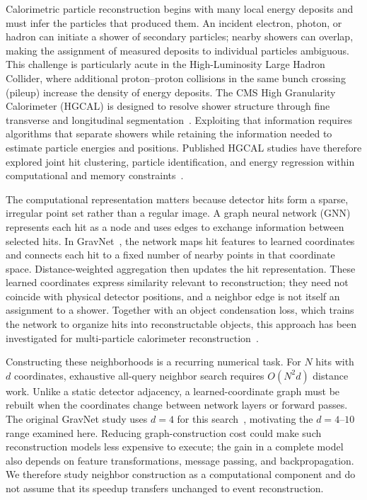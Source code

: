 \documentclass[final,3p,11pt]{elsarticle}
\begin{document}
Calorimetric particle reconstruction begins with many local energy
deposits and must infer the particles that produced them. An incident
electron, photon, or hadron can initiate a shower of secondary particles; nearby
showers can overlap, making the assignment of measured deposits to
individual particles ambiguous. This challenge is particularly acute in
the High-Luminosity Large Hadron Collider, where additional proton--proton
collisions in the same bunch crossing (pileup) increase the density of
energy deposits. The CMS High Granularity Calorimeter (HGCAL) is designed to
resolve shower structure through fine transverse and longitudinal
segmentation~\cite{pitters2018hgcal}. Exploiting that information requires
algorithms that separate showers while retaining the information needed
to estimate particle energies and positions. Published HGCAL studies
have therefore explored joint hit clustering, particle identification,
and energy regression within computational and memory
constraints~\cite{qasim2021multiparticle}.

The computational representation matters because detector hits form a
sparse, irregular point set rather than a regular image. A graph neural
network (GNN) represents each hit as a node and uses edges to exchange
information between selected hits. In GravNet~\cite{Qasim2019GravNet},
the network maps hit features to learned coordinates and connects each
hit to a fixed number of nearby points in that coordinate space.
Distance-weighted aggregation then updates the hit representation.
These learned coordinates express similarity relevant to reconstruction;
they need not coincide with physical detector positions, and a neighbor
edge is not itself an assignment to a shower. Together with an object
condensation loss, which trains the network to organize hits into
reconstructable objects, this approach has been investigated for
multi-particle calorimeter reconstruction~\cite{Kieseler2020ObjectCondensation,qasim2021multiparticle,bhattacharya2022gnn}.

Constructing these neighborhoods is a recurring numerical task. For
$N$ hits with $d$ coordinates, exhaustive all-query neighbor search
requires $O(N^2d)$ distance work. Unlike a static detector adjacency,
a learned-coordinate graph must be rebuilt when the coordinates change
between network layers or forward passes. The original GravNet study
uses $d{=}4$ for this search~\cite{Qasim2019GravNet}, motivating the
$d{=}4$--$10$ range examined here. Reducing graph-construction cost
could make such reconstruction models less expensive to execute;
the gain in a complete model also depends on feature transformations,
message passing, and backpropagation. We therefore study neighbor
construction as a computational component and do not assume that its
speedup transfers unchanged to event reconstruction.
\end{document}
